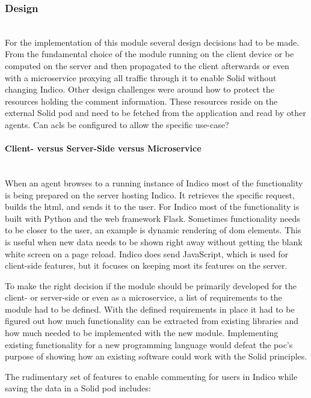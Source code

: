 \subsubsection{Design}\mbox{}\\

For the implementation of this module several design decisions had to be made. From the fundamental choice of the module running on the client device or be computed on the server and then propagated to the client afterwards or even with a microservice proxying all traffic through it to enable Solid without changing Indico.
Other design challenges were around how to protect the resources holding the comment information. These resources reside on the external Solid pod and need to be fetched from the application and read by other agents. Can \glspl{acl} be configured to allow the specific use-case?

\paragraph{Client- versus Server-Side versus Microservice}\mbox{}\\

When an agent browses to a running instance of Indico most of the functionality is being prepared on the server hosting Indico. It retrieves the specific request, builds the \gls{html}, and sends it to the user. For Indico most of the functionality is built with Python and the web framework Flask. Sometimes functionality needs to be closer to the user, an example is dynamic rendering of \gls{dom} elements. This is useful when new data needs to be shown right away without getting the blank white screen on a page reload.
Indico does send JavaScript, which is used for client-side features, but it focuses on keeping most its features on the server.

To make the right decision if the module should be primarily developed for the client- or server-side or even as a microservice, a list of requirements to the module had to be defined. With the defined requirements in place it had to be figured out how much functionality can be extracted from existing libraries and how much needed to be implemented with the new module. Implementing existing functionality for a new programming language would defeat the \gls{poc}’s purpose of showing how an existing software could work with the Solid principles.

The rudimentary set of features to enable commenting for users in Indico while saving the data in a Solid pod includes: 

